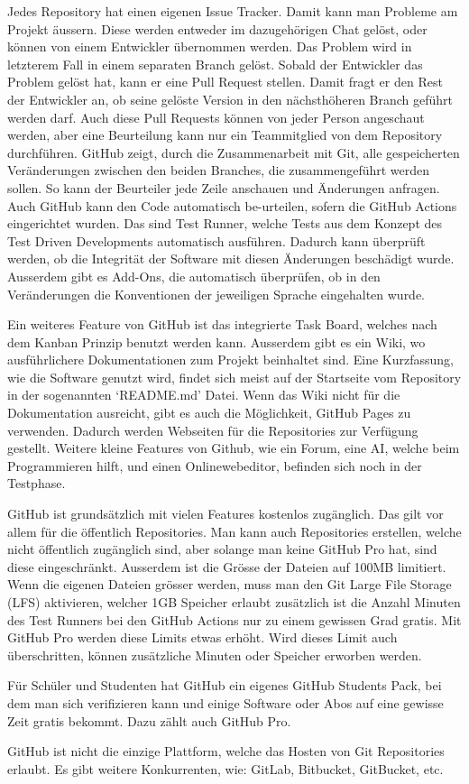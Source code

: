 Jedes Repository hat einen eigenen Issue Tracker. Damit kann man Probleme am
Projekt äussern. Diese werden entweder im dazugehörigen Chat gelöst, oder können
von einem Entwickler übernommen werden. Das Problem wird in letzterem Fall in
einem separaten Branch gelöst. Sobald der Entwickler das Problem gelöst hat,
kann er eine Pull Request stellen. Damit fragt er den Rest der Entwickler an, ob
seine gelöste Version in den nächsthöheren Branch geführt werden darf. Auch
diese Pull Requests können von jeder Person angeschaut werden, aber eine
Beurteilung kann nur ein Teammitglied von dem Repository durchführen. GitHub
zeigt, durch die Zusammenarbeit mit Git, alle gespeicherten Veränderungen
zwischen den beiden Branches, die zusammengeführt werden sollen. So kann der
Beurteiler jede Zeile anschauen und Änderungen anfragen. Auch GitHub kann den
Code automatisch be\hyp{}urteilen, sofern die GitHub Actions eingerichtet wurden. Das
sind Test Runner, welche Tests aus dem Konzept des Test Driven Developments
automatisch ausführen. Dadurch kann überprüft werden, ob die Integrität der
Software mit diesen Änderungen beschädigt wurde. Ausserdem gibt es Add-Ons, die
automatisch überprüfen, ob in den Veränderungen die Konventionen der jeweiligen
Sprache eingehalten wurde.

Ein weiteres Feature von GitHub ist das integrierte Task Board, welches nach dem
Kanban Prinzip benutzt werden kann. Ausserdem gibt es ein Wiki, wo
ausführlichere Dokumentationen zum Projekt beinhaltet sind. Eine Kurzfassung,
wie die Software genutzt wird, findet sich meist auf der Startseite vom
Repository in der sogenannten `README.md' Datei. Wenn das Wiki nicht für die
Dokumentation ausreicht, gibt es auch die Möglichkeit, GitHub Pages zu
verwenden. Dadurch werden Webseiten für die Repositories zur Verfügung gestellt.
Weitere kleine Features von Github, wie ein Forum, eine AI, welche beim
Programmieren hilft, und einen Onlinewebeditor, befinden sich noch in der
Testphase.

GitHub ist grundsätzlich mit vielen Features kostenlos zugänglich. Das gilt vor
allem für die öffentlich Repositories. Man kann auch Repositories erstellen,
welche nicht öffentlich zugänglich sind, aber solange man keine GitHub Pro hat,
sind diese eingeschränkt. Ausserdem ist die Grösse der Dateien auf 100MB
limitiert. Wenn die eigenen Dateien grösser werden, muss man den Git Large File
Storage (LFS) aktivieren, welcher 1GB Speicher erlaubt zusätzlich ist die Anzahl
Minuten des Test Runners bei den GitHub Actions nur zu einem gewissen Grad
gratis. Mit GitHub Pro werden diese Limits etwas erhöht. Wird dieses Limit auch
überschritten, können zusätzliche Minuten oder Speicher erworben werden.

Für Schüler und Studenten hat GitHub ein eigenes GitHub Students Pack, bei dem
man sich verifizieren kann und einige Software oder Abos auf eine gewisse Zeit
gratis bekommt. Dazu zählt auch GitHub Pro.

GitHub ist nicht die einzige Plattform, welche das Hosten von Git Repositories
erlaubt. Es gibt weitere Konkurrenten, wie: GitLab, Bitbucket, GitBucket, etc.
\cite{noauthor_top_2021}



